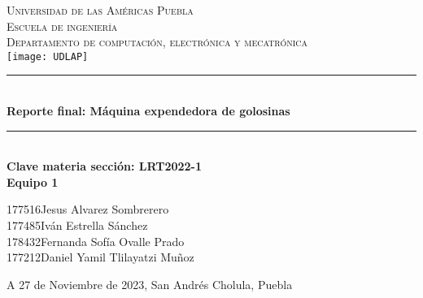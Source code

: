 \documentclass[12pt]{article}  %
\def\titulo{Reporte final: Máquina expendedora de golosinas}%
\def\materia{Clave materia sección: LRT2022-1} %
\def\fecha{27 de Noviembre de 2023} %
\def\equipo {1}%
\def\ida{177516} %
\def\esta{Jesus Alvarez Sombrerero}
\def\idb{177485}
\def\estb{Iván Estrella Sánchez}
\def\idc{178432}
\def\estc{Fernanda Sofía Ovalle Prado}
\def\idd{177212}
\def\estd{Daniel Yamil Tlilayatzi Muñoz}
\begin{document}
\begin{center}
  \newcommand{\HRule}{\rule{\linewidth}{0.5mm}}
  \thispagestyle{empty}
  \vspace*{-1.5cm}
  \textsc{\huge Universidad de las Américas Puebla}\\[1.5cm]
  \textsc{\LARGE Escuela de ingeniería}\\[1.5cm]
  \textsc{\LARGE Departamento de computación, electrónica y mecatrónica}\\[1.5cm]
  \texttt{[image: UDLAP]}  									\vspace*{1cm}														\HRule \\[0.4cm]
  { \huge \bfseries \titulo}\\[0.4cm]
  \HRule \\[1cm]
  { \Large \bfseries \materia}\\[1cm]
  { \Large \bfseries Equipo \equipo}\\[1cm]
  \begin{flushleft} \Large
    \ida \hspace{0.5cm}\esta \\
    \idb \hspace{0.5cm}\estb \\
    \idc \hspace{0.5cm}\estc \\
    \idd \hspace{0.5cm}\estd \\ %
  \end{flushleft}
  \vfill
  \begin{center}
    {\Large A \fecha, San Andrés Cholula, Puebla}
  \end{center}
\end{center}							 								\newpage
\thispagestyle{empty} %
\tableofcontents %
\newpage %
\setcounter{page}{1} %
\end{document}
